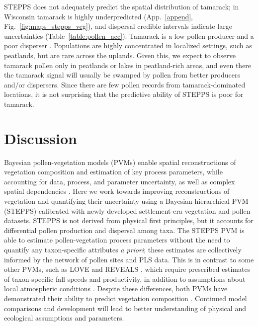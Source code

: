 \documentclass[12pt]{article}
\begin{document}
STEPPS does not adequately predict the spatial distribution of
tamarack; in Wisconsin tamarack is highly underpredicted
(App.~\ref{append}, Fig.~\ref{fig:maps_stepps_veg}), and dispersal
credible intervals indicate large uncertainties
(Table~\ref{table:pollen_acc}). Tamarack is a low pollen producer and
a poor disperser \citep{janssen1966recent,
  webb1981estimating}. Populations are highly concentrated in
localized settings, such as peatlands, but are rare across the
uplands. Given this, we expect to observe tamarack pollen only in
peatlands or lakes in peatland-rich areas, and even there the tamarack
signal will usually be swamped by pollen from better producers and/or
dispersers. Since there are few pollen records from tamarack-dominated
locations, it is not surprising that the predictive ability of STEPPS
is poor for tamarack.

\section{Discussion}

Bayesian pollen-vegetation models (PVMs) enable spatial
reconstructions of vegetation composition and estimation of key
process parameters, while accounting for data, process, and parameter
uncertainty, as well as complex spatial dependencies
\citep{paciorek2009mapping}. Here we work towards improving
reconstructions of vegetation and quantifying their uncertainty using
a Bayesian hierarchical PVM (STEPPS) calibrated with newly developed
settlement-era vegetation and pollen datasets. STEPPS is not derived
from physical first principles, but it accounts for differential
pollen production and dispersal among taxa. The STEPPS PVM is able to
estimate pollen-vegetation process parameters without the need to
quantify any taxon-specific attributes \textit{a priori}; these
estimates are collectively informed by the network of pollen sites and
PLS data. This is in contrast to some other PVMs, such as LOVE and
REVEALS \citep{sugita2007theory1, sugita2007theory2}, which require
prescribed estimates of taxon-specific fall speeds and productivity,
in addition to assumptions about local atmospheric conditions
\citep{jackson1999pollen}. Despite these differences, both PVMs have
demonstrated their ability to predict vegetation composition
\citep{soepboer2010regional,wang2011reassessment,
  overballe2013quantitative}. Continued model comparisons and
development will lead to better understanding of physical and
ecological assumptions and parameters.
\end{document}
